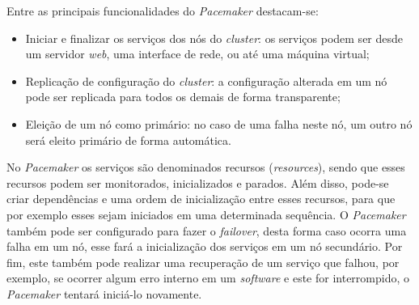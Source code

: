 Entre as principais funcionalidades do \textit{Pacemaker} destacam-se:
\begin{itemize}
 \item Iniciar e finalizar os serviços dos nós do \textit{cluster}: os serviços podem ser desde um servidor \textit{web}, uma interface de 
 rede, ou até uma máquina virtual;
 \item Replicação de configuração do \textit{cluster}: a configuração alterada em um nó pode ser replicada para todos os demais de forma 
 transparente;
 \item Eleição de um nó como primário: no caso de uma falha neste nó, um outro nó será eleito primário de forma automática.
\end{itemize}

No \textit{Pacemaker} os serviços são denominados recursos (\textit{resources}), sendo que esses recursos podem ser monitorados, inicializados e 
parados. Além disso, pode-se criar dependências e uma ordem de inicialização entre esses recursos, para que por exemplo esses sejam iniciados 
em uma determinada sequência. O \textit{Pacemaker} também pode ser configurado para fazer o \textit{failover}, desta forma caso ocorra uma falha 
em um nó, esse fará a inicialização dos serviços em um nó secundário. Por fim, este também pode realizar uma recuperação de um serviço que falhou, 
por exemplo, se ocorrer algum erro interno em um \textit{software} e este for interrompido, o \textit{Pacemaker} 
tentará iniciá-lo novamente.

